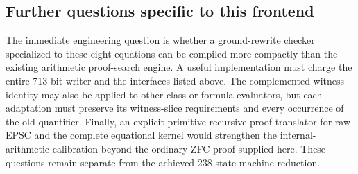 \subsection{Further questions specific to this frontend}

The immediate engineering question is whether a ground-rewrite checker
specialized to these eight equations can be compiled more compactly than
the existing arithmetic proof-search engine. A useful implementation
must charge the entire 713-bit writer and the interfaces listed above.
The complemented-witness identity may also be applied to other class or
formula evaluators, but each adaptation must preserve its witness-slice
requirements and every occurrence of the old quantifier. Finally, an
explicit primitive-recursive proof translator for raw EPSC and the
complete equational kernel would strengthen the internal-arithmetic
calibration beyond the ordinary ZFC proof supplied here. These questions
remain separate from the achieved 238-state machine reduction.
